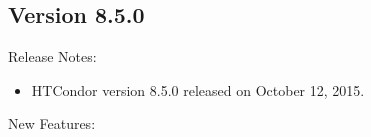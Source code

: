 \subsection*{\label{sec:New-8-5-0}Version 8.5.0}

\noindent Release Notes:

\begin{itemize}

\item HTCondor version 8.5.0 released on October 12, 2015.

\end{itemize}


\noindent New Features:

